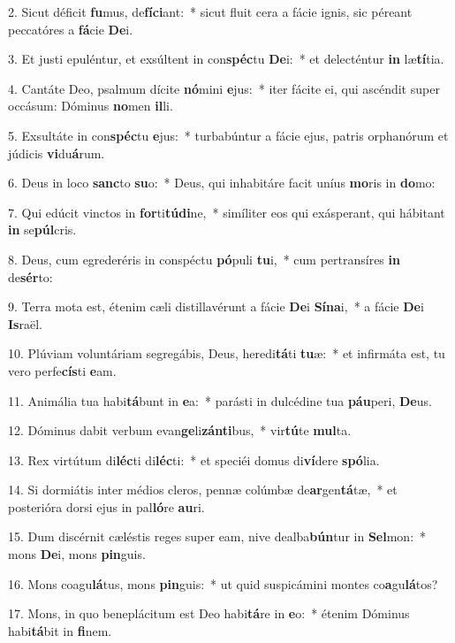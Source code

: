 2. Sicut déficit \textbf{fu}mus, de\textbf{fí}\textbf{ci}ant:~*  sicut fluit cera a fácie ignis, sic péreant peccatóres a \textbf{fá}cie \textbf{De}i.\

3. Et justi epuléntur, et exsúltent in con\textbf{spéc}tu \textbf{De}i:~*  et delecténtur \textbf{in} læ\textbf{tí}tia.\

4. Cantáte Deo, psalmum dícite \textbf{nó}mini \textbf{e}jus:~*  iter fácite ei, qui ascéndit super occásum: Dóminus \textbf{no}men \textbf{il}li.\

5. Exsultáte in con\textbf{spéc}tu \textbf{e}jus:~*  turbabúntur a fácie ejus, patris orphanórum et júdicis \textbf{vi}du\textbf{á}rum.\

6. Deus in loco \textbf{sanc}to \textbf{su}o:~*  Deus, qui inhabitáre facit uníus \textbf{mo}ris in \textbf{do}mo:\

7. Qui edúcit vinctos in \textbf{for}ti\textbf{tú}\textbf{di}ne,~*  simíliter eos qui exásperant, qui hábitant \textbf{in} se\textbf{púl}cris.\

8. Deus, cum egrederéris in conspéctu \textbf{pó}puli \textbf{tu}i,~*  cum pertransíres \textbf{in} de\textbf{sér}to:\

9. Terra mota est, étenim cæli distillavérunt a fácie \textbf{De}i \textbf{Sí}\textbf{na}i,~*  a fácie \textbf{De}i \textbf{Is}raël.\

10. Plúviam voluntáriam segregábis, Deus, heredi\textbf{tá}ti \textbf{tu}æ:~*  et infirmáta est, tu vero perfe\textbf{cís}ti \textbf{e}am.\

11. Animália tua habi\textbf{tá}bunt in \textbf{e}a:~*  parásti in dulcédine tua \textbf{páu}peri, \textbf{De}us.\

12. Dóminus dabit verbum evan\textbf{ge}li\textbf{zán}\textbf{ti}bus,~*  vir\textbf{tú}te \textbf{mul}ta.\

13. Rex virtútum di\textbf{léc}ti di\textbf{léc}ti:~*  et speciéi domus di\textbf{ví}dere \textbf{spó}lia.\

14. Si dormiátis inter médios cleros, pennæ colúmbæ de\textbf{ar}gen\textbf{tá}tæ,~*  et posterióra dorsi ejus in pal\textbf{ló}re \textbf{au}ri.\

15. Dum discérnit cæléstis reges super eam, nive dealba\textbf{bún}tur in \textbf{Sel}mon:~*  mons \textbf{De}i, mons \textbf{pin}guis.\

16. Mons coagu\textbf{lá}tus, mons \textbf{pin}guis:~*  ut quid suspicámini montes co\textbf{a}gu\textbf{lá}tos?\

17. Mons, in quo beneplácitum est Deo habi\textbf{tá}re in \textbf{e}o:~*  étenim Dóminus habi\textbf{tá}bit in \textbf{fi}nem.\

